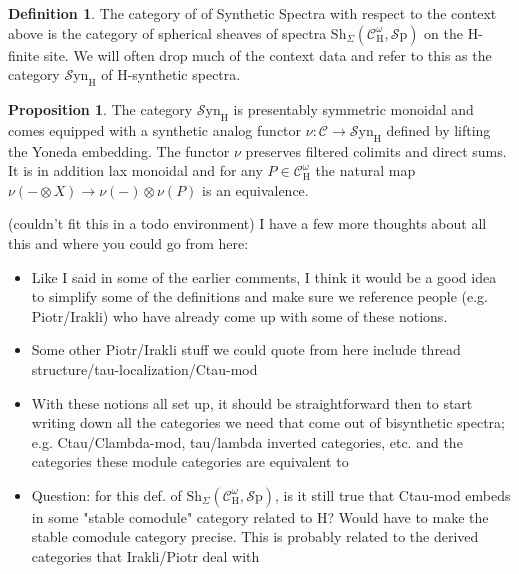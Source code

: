 \documentclass[10pt]{amsart}
\theoremstyle{definition}
\numberwithin{figure}{section}
\numberwithin{equation}{section}
\newtheorem{proposition}[figure]{Proposition}
\newtheorem{definition}[figure]{Definition}
\newcommand{\cC}{\mathcal{C}}
\theoremstyle{cited}
\newcommand{\Sp}{{\mathcal{S}\mathrm{p}}}
\newcommand{\Sh}{\mathrm{Sh}}
\newcommand{\Syn}{\mathcal{S}\mathrm{yn}}
\renewcommand{\H}{\mathrm{H}}
\begin{document}
\begin{definition}
  The category of of Synthetic Spectra with respect to the context above is the category of spherical sheaves of spectra $\Sh_\Sigma(\cC^\omega_\H, \Sp)$ on the $\H$-finite site. We will often drop much of the context data and refer to this as the category $\Syn_\H$ of $\H$-synthetic spectra.
\end{definition}

\begin{proposition}
  The category $\Syn_\H$ is presentably symmetric monoidal and comes equipped with a synthetic analog functor $\nu:\cC\to \Syn_\H$ defined by lifting the Yoneda embedding. The functor $\nu$ preserves filtered colimits and direct sums. It is in addition lax monoidal and for any $P\in \cC^\omega_\H$ the natural map $\nu(-\otimes X)\to \nu(-)\otimes \nu(P)$ is an equivalence.
\end{proposition}


(couldn't fit this in a todo environment) I have a few more thoughts about all this and where you could go from here: 

\begin{itemize}
    \item Like I said in some of the earlier comments, I think it would be a good idea to simplify some of the definitions and make sure we reference people (e.g. Piotr/Irakli) who have already come up with some of these notions.
    \item Some other Piotr/Irakli stuff we could quote from here include thread structure/tau-localization/Ctau-mod
    \item With these notions all set up, it should be straightforward then to start writing down all the categories we need that come out of bisynthetic spectra; e.g. Ctau/Clambda-mod, tau/lambda inverted categories, etc. and the categories these module categories are equivalent to
    \item Question: for this def. of $\Sh_\Sigma(\cC^\omega_\H, \Sp)$, is it still true that Ctau-mod embeds in some "stable comodule" category related to $\H$? Would have to make the stable comodule category precise. This is probably related to the derived categories that Irakli/Piotr deal with
\end{itemize}
\end{document}
